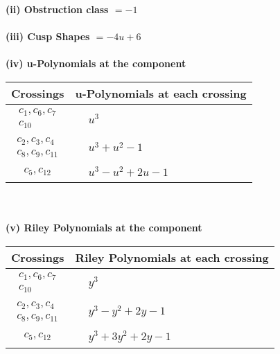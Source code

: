 \documentclass[1p]{elsarticle_modified}
\theoremstyle{definition}
\begin{document}
\flushleft \textbf{(ii) Obstruction class $= -1$}\\~\\
\flushleft \textbf{(iii) Cusp Shapes $= -4 u+6$}\\~\\
\newpage\renewcommand{\arraystretch}{1}
\flushleft \textbf{(iv) u-Polynomials at the component}\newline \\
\begin{tabular}{m{50pt}|m{274pt}}
Crossings & \hspace{64pt}u-Polynomials at each crossing \\
\hline $$\begin{aligned}c_{1},c_{6},c_{7}\\c_{10}\end{aligned}$$&$\begin{aligned}
&u^3
\end{aligned}$\\
\hline $$\begin{aligned}c_{2},c_{3},c_{4}\\c_{8},c_{9},c_{11}\end{aligned}$$&$\begin{aligned}
&u^3+u^2-1
\end{aligned}$\\
\hline $$\begin{aligned}c_{5},c_{12}\end{aligned}$$&$\begin{aligned}
&u^3- u^2+2 u-1
\end{aligned}$\\
\hline
\end{tabular}\\~\\
\newpage\renewcommand{\arraystretch}{1}
\flushleft \textbf{(v) Riley Polynomials at the component}\newline \\
\begin{tabular}{m{50pt}|m{274pt}}
Crossings & \hspace{64pt}Riley Polynomials at each crossing \\
\hline $$\begin{aligned}c_{1},c_{6},c_{7}\\c_{10}\end{aligned}$$&$\begin{aligned}
&y^3
\end{aligned}$\\
\hline $$\begin{aligned}c_{2},c_{3},c_{4}\\c_{8},c_{9},c_{11}\end{aligned}$$&$\begin{aligned}
&y^3- y^2+2 y-1
\end{aligned}$\\
\hline $$\begin{aligned}c_{5},c_{12}\end{aligned}$$&$\begin{aligned}
&y^3+3 y^2+2 y-1
\end{aligned}$\\
\hline
\end{tabular}\\~\\
\end{document}
